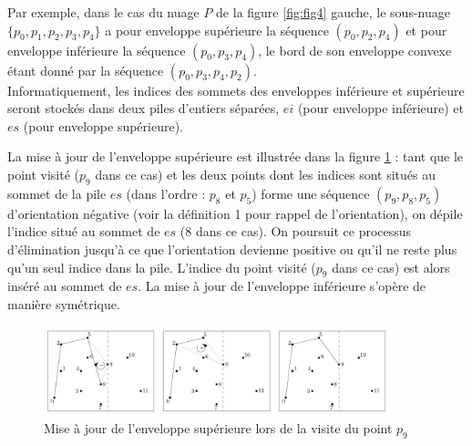 \documentclass[a4paper,french,bookmarks]{article}
\begin{document}
Par exemple, dans le cas du nuage $P$ de la figure \ref{fig:fig4} gauche, le sous-nuage $\{p_0, p_1, p_2, p_3, p_4\}$ a pour enveloppe supérieure la séquence $(p_0, p_2, p_4)$ et pour enveloppe inférieure la séquence $(p_0, p_3, p_4)$, le bord de son enveloppe convexe étant donné par la séquence $(p_0, p_3, p_4, p_2)$.\\

Informatiquement, les indices des sommets des enveloppes inférieure et supérieure seront stockés dans deux piles d’entiers séparées, $ei$ (pour enveloppe inférieure) et $es$ (pour enveloppe supérieure).

La mise à jour de l’enveloppe supérieure est illustrée dans la figure \ref{fig:fig5} : tant que le point visité ($p_9$ dans ce cas) et les deux points dont les indices sont situés au sommet de la pile $es$ (dans l’ordre : $p_8$ et $p_5$)
forme une séquence $(p_9, p_8, p_5)$ d’orientation négative (voir la définition 1 pour rappel de l’orientation), on dépile l’indice situé au sommet de $es$ (8 dans ce cas). On poursuit ce processus d’élimination jusqu’à ce que l’orientation devienne positive ou qu’il ne reste plus qu’un seul indice dans la pile. L’indice du point visité ($p_9$ dans ce cas) est alors inséré au sommet de $es$. La mise à jour de l’enveloppe inférieure s’opère de manière symétrique.

\begin{figure}[!ht]
    \centering
    \includegraphics[width=0.9\textwidth]{dm1/figure5.jpg}
    \caption{ Mise à jour de l’enveloppe supérieure lors de la visite du point $p_9$}
    \label{fig:fig5}
\end{figure}
\end{document}

